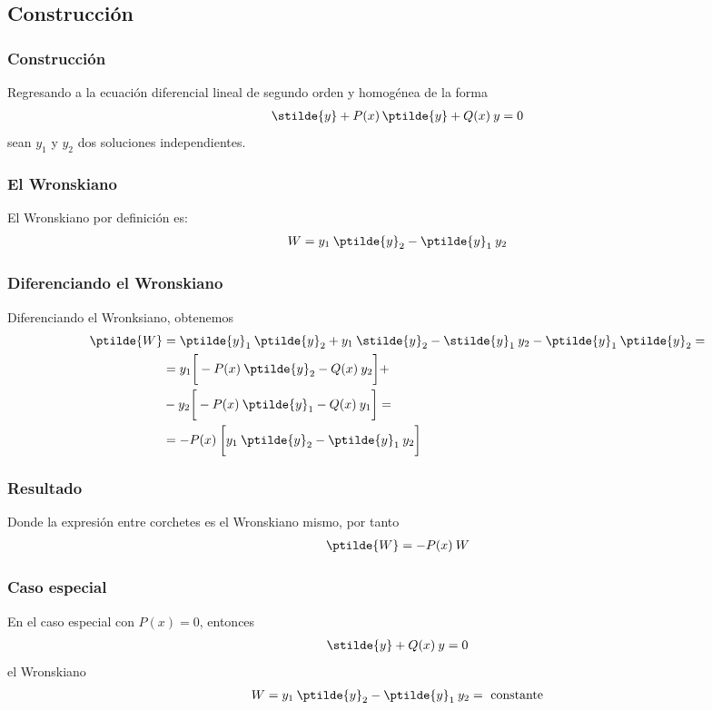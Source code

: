\subsection{Construcción}
\begin{frame}
\frametitle{Construcción}
Regresando a la ecuación diferencial lineal de segundo orden y homogénea de la forma
\begin{align}
\stilde{y} + P(x) \, \ptilde{y} + Q(x) \: y = 0
\label{eq:ecuacion_09_118}
\end{align}
sean $y_{1}$ y $y_{2}$ dos soluciones independientes.
\end{frame}
\begin{frame}
\frametitle{El Wronskiano}
El Wronskiano por definición es:
\begin{align}
W = y_{1} \: \ptilde{y}_{2} - \ptilde{y}_{1} \: y_{2}
\label{eq:ecuacion_09_119}
\end{align}
\end{frame}
\begin{frame}
\frametitle{Diferenciando el Wronskiano}
Diferenciando el Wronksiano, obtenemos
\begin{align*}
\ptilde{W} &= \ptilde{y}_{1} \: \ptilde{y}_{2} + y_{1} \: \stilde{y}_{2} - \stilde{y}_{1} \: y_{2} - \ptilde{y}_{1} \: \ptilde{y}_{2} = \\
&= y_{1} \bigg[ - P(x) \: \ptilde{y}_{2} - Q(x) \: y_{2} \bigg] + \\
&- y_{2} \bigg[ - P(x) \: \ptilde{y}_{1} - Q(x)  \: y_{1} \bigg] = \\
&= - P(x) \: \bigg[ y_{1} \: \ptilde{y}_{2} - \ptilde{y}_{1} \: y_{2} \bigg]
\end{align*}
\end{frame}
\begin{frame}
\frametitle{Resultado}
Donde la expresión entre corchetes es el Wronskiano mismo, por tanto
\begin{align}
\ptilde{W} = - P(x) \: W
\label{eq:ecuacion_09_120}
\end{align}
\end{frame}
\begin{frame}
\frametitle{Caso especial}
En el caso especial con $P(x) = 0$, entonces
\begin{align}
\stilde{y} + Q(x) \: y = 0
\label{eq:ecuacion_09_121}
\end{align}
el Wronskiano
\begin{align}
W = y_{1} \: \ptilde{y}_{2} - \ptilde{y}_{1} \: y_{2} = \mbox{ constante}
\label{eq:ecuacion_09_1202}
\end{align}
\end{frame}

